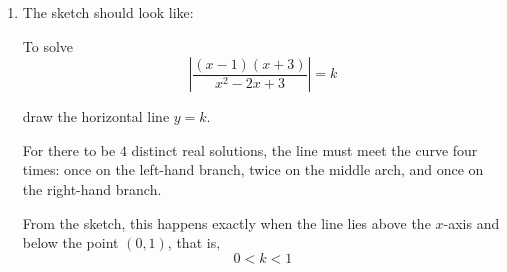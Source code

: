 \documentclass[leqno]{article}
\begin{document}
\begin{enumerate}[
  label=\textbf{\arabic*.},
  leftmargin=*,
  topsep=0pt,
  partopsep=0pt,
  parsep=0pt
]
\begin{djsSolution}
\begin{enumerate}[label=\textbf{(\alph*)}]
  The intersection with the $y$-axis is found by putting $x=0$:
  \[
  y=\frac{(-1)(3)}{3}=-1
  \]

  So the $y$-intercept is
  \[
  (0,-1)
  \]

  Using parts (a) and (b), the curve has horizontal asymptote $y=1$, minimum point $(0,-1)$ and maximum point $(3,2)$.

  It also crosses the horizontal asymptote when $y=1$:
  \begin{align*}
  \frac{x^2+2x-3}{x^2-2x+3}&=1\\
  x^2+2x-3&=x^2-2x+3\\
  4x&=6\\
  x&=\frac32
  \end{align*}

  So it crosses the asymptote at
  \[
  \left(\frac32,1\right)
  \]

\item The sketch should look like:\par\nopagebreak


To solve
\[
\left|\frac{(x-1)(x+3)}{x^2-2x+3}\right|=k
\]

draw the horizontal line $y=k$.

For there to be $4$ distinct real solutions, the line must meet the curve four times: once on the left-hand branch, twice on the middle arch, and once on the right-hand branch.

From the sketch, this happens exactly when the line lies above the $x$-axis and below the point $(0,1)$, that is,
\[
0<k<1
\]
\end{enumerate}
\end{djsSolution}


\newpage


\end{enumerate}
\end{document}
